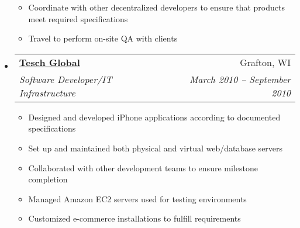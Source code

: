 \documentclass[letterpaper,12pt]{article}
\makeatletter
\newcommand{\resitem}[1]{\item #1 \vspace{-2pt}}
\newcommand{\ressubheading}[4]{
      \begin{tabular*}{6.5in}{l@{\extracolsep{\fill}}r}
        \textbf{#1} & #2 \\
        \textit{#3} & \textit{#4} \\
      \end{tabular*}\vspace{-6pt}}
\makeatother
\begin{document}
\begin{itemize}
{\begin{itemize}
\begin{itemize}
        \end{itemize}
        \resitem{Coordinate with other decentralized developers to ensure that products meet required specifications}
        \resitem{Travel to perform on-site QA with clients}
    \end{itemize}
    }
  \item
    \ressubheading{\href{http://www.teschglobal.com/}{Tesch Global}}{Grafton, WI}{Software Developer/IT Infrastructure}{March 2010 -- September 2010}
    { \footnotesize
    \begin{itemize}
        \resitem{Designed and developed iPhone applications according to documented specifications}
        \resitem{Set up and maintained both physical and virtual web/database servers}
        \resitem{Collaborated with other development teams to ensure milestone completion}
        \resitem{Managed Amazon EC2 servers used for testing environments}
        \resitem{Customized e-commerce installations to fulfill requirements}
    \end{itemize}
    }


\end{itemize}
\end{document}
